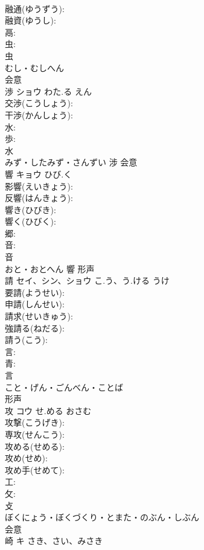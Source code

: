 \documentclass[8pt]{extreport}
\begin{document}
\begin{CJK}{UTF8}{min}
\\	融通(ゆうずう): 
\\	融資(ゆうし): 
\\	鬲: 
\\	虫: 
\\	虫	
\\	むし・むしへん	
\\	会意 
\\	渉	ショウ	わた.る	えん	
\\	交渉(こうしょう): 
\\	干渉(かんしょう): 
\\	水: 
\\	歩: 
\\	水	
\\	みず・したみず・さんずい	涉	会意 
\\	響	キョウ	ひび.く		
\\	影響(えいきょう): 
\\	反響(はんきょう): 
\\	響き(ひびき): 
\\	響く(ひびく): 
\\	郷: 
\\	音: 
\\	音	
\\	おと・おとへん	響	形声 
\\	請	セイ、シン、ショウ	こ.う、う.ける	うけ	
\\	要請(ようせい): 
\\	申請(しんせい): 
\\	請求(せいきゅう): 
\\	強請る(ねだる): 
\\	請う(こう): 
\\	言: 
\\	青: 
\\	言	
\\	こと・げん・ごんべん・ことば	
\\	形声 
\\	攻	コウ	せ.める	おさむ	
\\	攻撃(こうげき): 
\\	専攻(せんこう): 
\\	攻める(せめる): 
\\	攻め(せめ): 
\\	攻め手(せめて): 
\\	工: 
\\	攵: 
\\	攴	
\\	ぼくにょう・ぼくづくり・とまた・のぶん・しぶん	
\\	会意 
\\	崎	キ	さき、さい、みさき		

\end{CJK}
\end{document}

